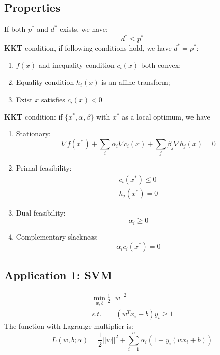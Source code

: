 \documentclass{article}
\begin{document}
\subsection{Properties}
If both $p^*$ and $d^*$ exists, we have:
\begin{equation}
d^* \le p^*
\end{equation}
\textbf{KKT} condition, if following conditions hold, we have $d^*=p^*$:
\begin{enumerate}
\item $f(x)$ and inequality condition $c_i(x)$ both convex;
\item Equality condition $h_i(x)$ is an affine transform;
\item Exist $x$ satisfies $c_i(x)<0$
\end{enumerate}

\textbf{KKT} condition: if $\{x^*,\alpha,\beta\}$ with $x^*$ as a local optimum, we have
\begin{enumerate}
\item Stationary:
\begin{equation}
\nabla f(x^*)+\sum_i\alpha_i\nabla c_i(x)+\sum_j\beta_j\nabla h_j(x)=0
\end{equation}
\item Primal feasibility:
\begin{eqnarray}
c_i(x^*)\le 0\\
h_j(x^*)=0
\end{eqnarray}
\item Dual feasibility:
\begin{equation}
\alpha_i\ge0
\end{equation}
\item Complementary slackness:
\begin{equation}
\alpha_ic_i(x^*)=0
\end{equation}
\end{enumerate}

\subsection{Application 1: SVM}
\begin{eqnarray}
\min_{w,b}\frac{1}{2}||w||^2\\
s.t.\qquad (w^Tx_i+b)y_i\ge1
\end{eqnarray}
The function with Lagrange multiplier is:
\begin{equation*}
L(w,b;\alpha) =\frac{1}{2}||w||^2+\sum_{i=1}^n\alpha_i(1-y_i(wx_i+b))
\end{equation*}
\end{document}
